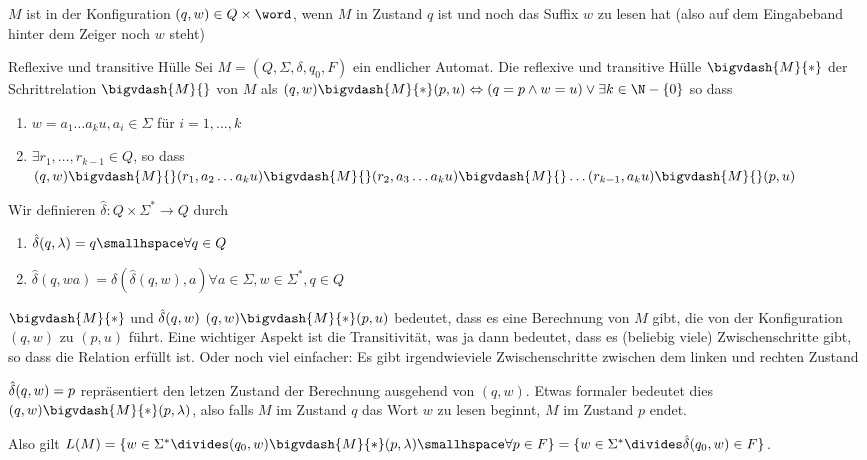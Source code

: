 $M$ ist in der Konfiguration $(q, w) \in Q \times \word$, wenn $M$ in Zustand $q$ ist und noch das Suffix $w$ zu lesen hat (also auf dem Eingabeband hinter dem Zeiger noch $w$ steht)

\begin{definition}[]{Reflexive und transitive Hülle}
    Sei $M = (Q, \Sigma, \delta, q_0, F)$ ein endlicher Automat. Die reflexive und transitive Hülle $\bigvdash{M}{*}$ der Schrittrelation $\bigvdash{M}{}$ von $M$ als
    $(q, w) \bigvdash{M}{*} (p, u) \Leftrightarrow (q = p \land w = u) \lor \exists k \in \N - \{ 0 \}$ so dass
    \begin{enumerate}[label=\textit{(\roman*)}]
        \item $w = a_1\ldots a_ku, a_i \in \Sigma$ für $i = 1, \ldots, k$
        \item $\exists r_1, \ldots, r_{k - 1} \in Q$, so dass
              $(q, w) \bigvdash{M}{} (r_1, a_2 \ldots a_k u) \bigvdash{M}{} (r_2, a_3 \ldots a_k u) \bigvdash{M}{} \ldots (r_{k - 1}, a_k u) \bigvdash{M}{} (p, u)$
    \end{enumerate}
    Wir definieren $\hat{\delta}: Q \times \Sigma^* \rightarrow Q$ durch
    \rmvspace
    \rmvspace
    \begin{multicols}{2}
        \begin{enumerate}[label=\textit{(\roman*)}]
            \item $\hat{\delta}(q, \lambda) = q \smallhspace \forall q \in Q$
            \item $\hat{\delta}(q, wa) = \delta(\hat{\delta}(q, w), a) \forall a \in \Sigma, w \in \Sigma^*, q \in Q$
        \end{enumerate}
    \end{multicols}
\end{definition}

\begin{intuition}[]{$\bigvdash{M}{*}$ und $\hat{\delta}(q, w)$}
    $(q, w) \bigvdash{M}{*} (p, u)$ bedeutet, dass es eine Berechnung von $M$ gibt, die von der Konfiguration $(q, w)$ zu $(p, u)$ führt.
    Eine wichtiger Aspekt ist die Transitivität, was ja dann bedeutet, dass es (beliebig viele) Zwischenschritte gibt, so dass die Relation erfüllt ist.
    Oder noch viel einfacher: Es gibt irgendwieviele Zwischenschritte zwischen dem linken und rechten Zustand

    $\hat{\delta}(q, w) = p$ repräsentiert den letzen Zustand der Berechnung ausgehend von $(q, w)$.
    Etwas formaler bedeutet dies $(q, w) \bigvdash{M}{*} (p, \lambda)$, also falls $M$ im Zustand $q$ das Wort $w$ zu lesen beginnt, $M$ im Zustand $p$ endet.
\end{intuition}
Also gilt $L(M) = \{ w \in \Sigma^* \divides (q_0, w) \bigvdash{M}{*} (p, \lambda) \smallhspace \forall p \in F \} = \{ w \in \Sigma^* \divides \hdelta(q_0, w) \in F \}$.


